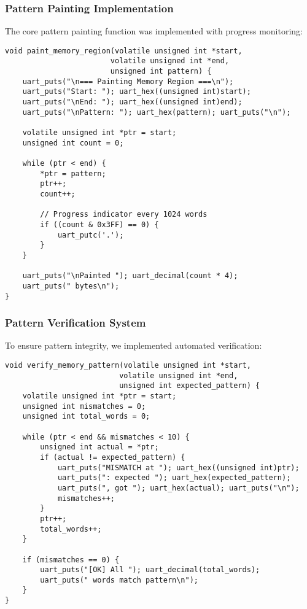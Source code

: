 \documentclass[11pt,a4paper]{article}
\begin{document}
\subsubsection{Pattern Painting Implementation}

The core pattern painting function was implemented with progress monitoring:

\begin{lstlisting}[caption={Memory Pattern Painting Implementation}]
void paint_memory_region(volatile unsigned int *start, 
                        volatile unsigned int *end, 
                        unsigned int pattern) {
    uart_puts("\n=== Painting Memory Region ===\n");
    uart_puts("Start: "); uart_hex((unsigned int)start); 
    uart_puts("\nEnd: "); uart_hex((unsigned int)end);
    uart_puts("\nPattern: "); uart_hex(pattern); uart_puts("\n");
    
    volatile unsigned int *ptr = start;
    unsigned int count = 0;
    
    while (ptr < end) {
        *ptr = pattern;
        ptr++;
        count++;
        
        // Progress indicator every 1024 words
        if ((count & 0x3FF) == 0) {
            uart_putc('.');
        }
    }
    
    uart_puts("\nPainted "); uart_decimal(count * 4); 
    uart_puts(" bytes\n");
}
\end{lstlisting}

\subsubsection{Pattern Verification System}

To ensure pattern integrity, we implemented automated verification:

\begin{lstlisting}[caption={Memory Pattern Verification}]
void verify_memory_pattern(volatile unsigned int *start, 
                          volatile unsigned int *end, 
                          unsigned int expected_pattern) {
    volatile unsigned int *ptr = start;
    unsigned int mismatches = 0;
    unsigned int total_words = 0;
    
    while (ptr < end && mismatches < 10) {
        unsigned int actual = *ptr;
        if (actual != expected_pattern) {
            uart_puts("MISMATCH at "); uart_hex((unsigned int)ptr);
            uart_puts(": expected "); uart_hex(expected_pattern);
            uart_puts(", got "); uart_hex(actual); uart_puts("\n");
            mismatches++;
        }
        ptr++;
        total_words++;
    }
    
    if (mismatches == 0) {
        uart_puts("[OK] All "); uart_decimal(total_words); 
        uart_puts(" words match pattern\n");
    }
}
\end{lstlisting}
\end{document}
